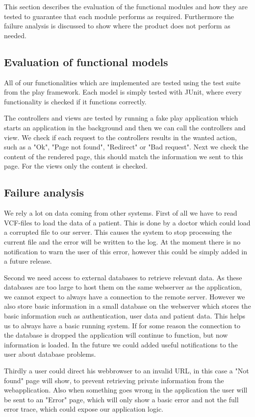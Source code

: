 This section describes the evaluation of the functional modules and how they are tested to guarantee that each module performs as required.
Furthermore the failure analysis is discussed to show where the product does not perform as needed.

\subsection{Evaluation of functional models}
All of our functionalities which are implemented are tested using the test suite from the play framework. Each model is simply tested with JUnit, where every functionality is checked if it functions correctly.

The controllers and views are tested by running a fake play application which starts an application in the background and then we can call the controllers and view. We check if each request to the controllers results in the wanted action, such as a "Ok", "Page not found", "Redirect" or "Bad request". Next we check the content of the rendered page, this should match the information we sent to this page. For the views only the content is checked.
 

\subsection{Failure analysis}
We rely a lot on data coming from other systems.
First of all we have to read VCF-files to load the data of a patient. This is done by a doctor which could load a corrupted file to our server.
This causes the system to stop processing the current file and the error will be written to the log.
At the moment there is no notification to warn the user of this error, however this could be simply added in a future release.

Second we need access to external databases to retrieve relevant data.
As these databases are too large to host them on the same webserver as the application, we cannot expect to always have a connection to the remote server.
However we also store basic information in a small database on the webserver which stores the basic information such as authentication, user data and patient data.
This helps us to always have a basic running system.
If for some reason the connection to the database is dropped the application will continue to function, but now information is loaded.
In the future we could added useful notifications to the user about database problems.

Thirdly a user could direct his webbrowser to an invalid URL, in this case a "Not found" page will show, to prevent retrieving private information from the webapplication.
Also when something goes wrong in the application the user will be sent to an "Error" page, which will only show a basic error and not the full error trace, which could expose our application logic.